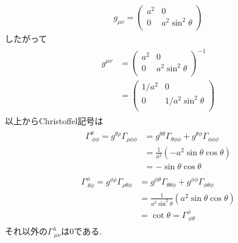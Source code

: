 \documentclass[uplatex,a4j,11pt,dvipdfmx]{jsarticle}
\begin{document}
\begin{align}
  g_{\mu\nu}=\left(
    \begin{array}{cc}
      a^2&0\\
      0&a^2\sin^2\theta\\
    \end{array}
  \right)
\end{align}
したがって
\begin{align}
  \begin{split}
    g^{\mu\nu}&=\left(
      \begin{array}{cc}
        a^2&0\\
        0&a^2\sin^2\theta\\
      \end{array}
      \right)^{-1}\\
      &=\left(
        \begin{array}{cc}
          1/a^2&0\\
          0&1/a^2\sin^2\theta\\
        \end{array}
        \right)
  \end{split}
\end{align}
以上からChristoffel記号は
\begin{align}
  \begin{split}
    \Gamma^\theta_{\ \phi\phi}=g^{\theta\rho}\Gamma_{\rho\phi\phi}&=g^{\theta\theta}\Gamma_{\theta\phi\phi}+g^{\theta\phi}\Gamma_{\phi\phi\phi}\\
    &=\frac{1}{a^2}(-a^2\sin\theta\cos\theta)\\
    &=-\sin\theta\cos\theta
  \end{split}
\end{align}
\begin{align}
  \begin{split}
    \Gamma^\phi_{\ \theta\phi}=g^{\phi\rho}\Gamma_{\rho\theta\phi}&=g^{\phi\theta}\Gamma_{\theta\theta\phi}+g^{\phi\phi}\Gamma_{\phi\theta\phi}\\
    &=\frac{1}{a^2\sin^2\theta}(a^2\sin\theta\cos\theta)\\
    &=\cot\theta=\Gamma^\phi_{\ \phi\theta}
  \end{split}
\end{align}
それ以外の$\Gamma^{\lambda}_{\ \mu\nu}$は$0$である.
\end{document}
